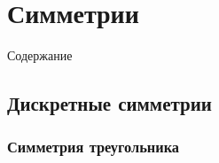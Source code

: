 \section{Симметрии}
\begin{frame}{Содержание}
    \tableofcontents[currentsection, subsectionstyle=show/show/hide]
\end{frame}
\subsection{Дискретные симметрии}
\begin{frame}
    \frametitle{Симметрия треугольника}
    \begin{columns}
        \begin{column}{0.33\textwidth}
            \begin{figure}[H]
                \begin{centering}
                    
                \end{centering}
            \end{figure}
            \begin{figure}[H]
                \begin{centering}
                    
                \end{centering}
            \end{figure}
        \end{column}
        \begin{column}{0.33\textwidth}
            \begin{figure}[H]
                \begin{centering}
                    
                \end{centering}
            \end{figure}
            \begin{figure}[H]
                \begin{centering}
                    
                \end{centering}
            \end{figure}
        \end{column}
        \begin{column}{0.33\textwidth}
            \begin{figure}[H]
                \begin{centering}
                    
                \end{centering}
            \end{figure}
            \begin{figure}[H]
                \begin{centering}
                    
                \end{centering}
            \end{figure}
        \end{column}
    \end{columns}
\end{frame}

